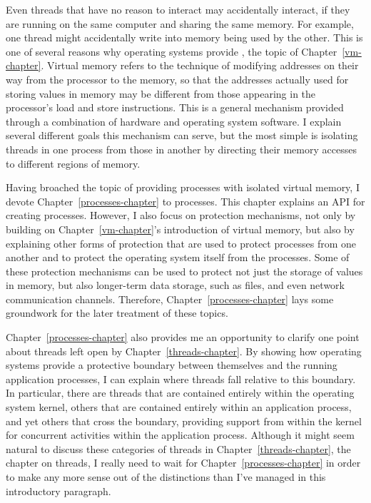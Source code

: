 Even threads that have no reason to interact may accidentally
interact, if they are running on the same computer and sharing the same
memory.  For example, one thread might accidentally write into memory being used by
the other.  This is one of several reasons why operating systems
provide , the topic of
Chapter~\ref{vm-chapter}.  Virtual memory refers to the technique of
modifying addresses on their way from the processor to the memory, so
that the addresses actually used for storing values in memory may be
different from those appearing in the processor's load and store
instructions.  This is a general mechanism provided through a
combination of hardware and operating system software.  I explain
several different goals this mechanism can serve, but the most
simple is isolating threads in one process from those in another by
directing their memory accesses to different regions of memory.

Having broached the topic of providing processes with isolated virtual
memory, I devote
Chapter~\ref{processes-chapter} to processes.  This chapter explains an API for
creating processes.  However, I also focus on protection
mechanisms, not only by building on Chapter~\ref{vm-chapter}'s introduction
of virtual memory, but also by explaining other forms of protection
that are
used to protect processes from one another and to protect the
operating system itself from the processes.  Some of these protection
mechanisms can be used to protect not just the storage of values in memory,
but also longer-term data storage, such as files, and even network
communication channels.  Therefore, Chapter~\ref{processes-chapter}
lays some groundwork for the later treatment of these topics.

Chapter~\ref{processes-chapter} also provides me an opportunity to
clarify one point about threads left open by
Chapter~\ref{threads-chapter}.  By showing how operating systems
provide a protective boundary between themselves and the running
application processes, I can explain where threads fall relative to
this boundary.  In particular, there are threads that are contained
entirely within the operating system kernel, others that are contained entirely
within an application process, and yet others that cross the boundary,
providing support from within the kernel for concurrent activities
within the application process.  Although it might seem natural to
discuss these categories of threads in Chapter~\ref{threads-chapter},
the chapter on threads, I really need to wait for
Chapter~\ref{processes-chapter} in order to make any more sense out of
the distinctions than I've managed in this introductory paragraph.

